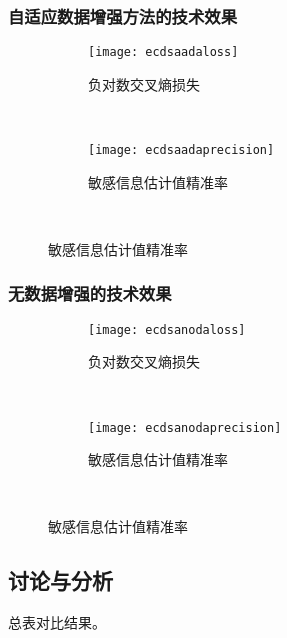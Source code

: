 {	\subsubsection{自适应数据增强方法的技术效果}
	\begin{figure}[!h]
		\centering
		\begin{subfigure}[b]{\twof\textwidth}
			\texttt{[image: ecdsaadaloss]}
			\caption{负对数交叉熵损失}
			\label{fig:ecdsaadaloss}
		\end{subfigure}%
		~%
		\begin{subfigure}[b]{\twof\textwidth}
			\texttt{[image: ecdsaadaprecision]}
			\caption{敏感信息估计值精准率}
			\label{fig:ecdsaadaprecision}
		\end{subfigure}
		\\
		\label{fig:ecdsaada}
	\end{figure}
	\subsubsection{无数据增强的技术效果}
	
	\begin{figure}[!h]
		\centering
		\begin{subfigure}[b]{\twof\textwidth}
			\texttt{[image: ecdsanodaloss]}
			\caption{负对数交叉熵损失}
			\label{fig:ecdsanodaloss}
		\end{subfigure}%
		~%
		\begin{subfigure}[b]{\twof\textwidth}
			\texttt{[image: ecdsanodaprecision]}
			\caption{敏感信息估计值精准率}
			\label{fig:ecdsanodaprecision}
		\end{subfigure}
		\\
		\label{fig:ecdsanoda}
	\end{figure}
	\subsection{讨论与分析}
	总表对比结果。
}